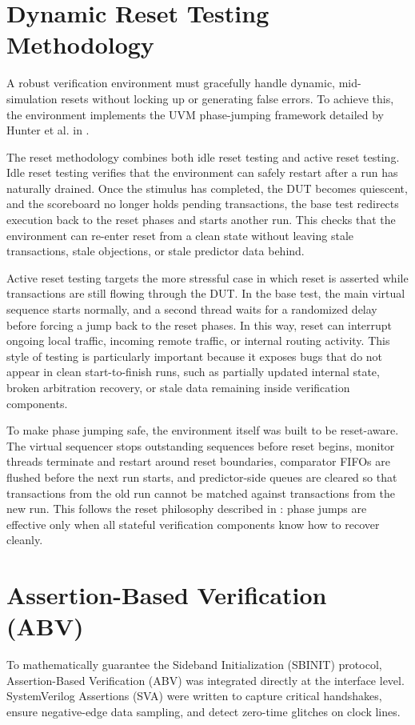 \section{Dynamic Reset Testing Methodology}
A robust verification environment must gracefully handle dynamic, mid-simulation resets without locking up or generating false errors. To achieve this, the environment implements the UVM phase-jumping framework detailed by Hunter et al. in \cite{HunterSNUG2013}.

The reset methodology combines both idle reset testing and active reset testing. Idle reset testing verifies that the environment can safely restart after a run has naturally drained. Once the stimulus has completed, the DUT becomes quiescent, and the scoreboard no longer holds pending transactions, the base test redirects execution back to the reset phases and starts another run. This checks that the environment can re-enter reset from a clean state without leaving stale transactions, stale objections, or stale predictor data behind.

Active reset testing targets the more stressful case in which reset is asserted while transactions are still flowing through the DUT. In the base test, the main virtual sequence starts normally, and a second thread waits for a randomized delay before forcing a jump back to the reset phases. In this way, reset can interrupt ongoing local traffic, incoming remote traffic, or internal routing activity. This style of testing is particularly important because it exposes bugs that do not appear in clean start-to-finish runs, such as partially updated internal state, broken arbitration recovery, or stale data remaining inside verification components.

To make phase jumping safe, the environment itself was built to be reset-aware. The virtual sequencer stops outstanding sequences before reset begins, monitor threads terminate and restart around reset boundaries, comparator FIFOs are flushed before the next run starts, and predictor-side queues are cleared so that transactions from the old run cannot be matched against transactions from the new run. This follows the reset philosophy described in \cite{HunterSNUG2013}: phase jumps are effective only when all stateful verification components know how to recover cleanly.

\section{Assertion-Based Verification (ABV)}
To mathematically guarantee the Sideband Initialization (SBINIT) protocol, Assertion-Based Verification (ABV) was integrated directly at the interface level. SystemVerilog Assertions (SVA) were written to capture critical handshakes, ensure negative-edge data sampling, and detect zero-time glitches on clock lines.

